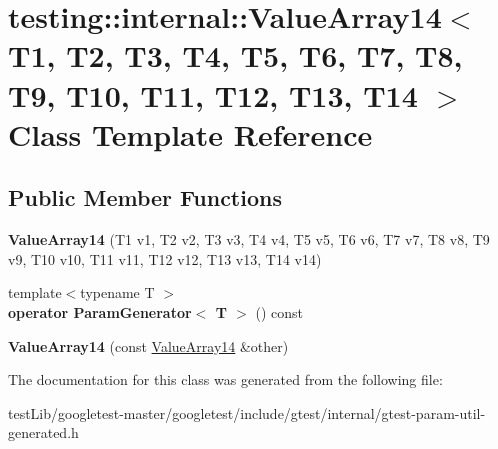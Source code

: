 \hypertarget{classtesting_1_1internal_1_1ValueArray14}{}\section{testing\+:\+:internal\+:\+:Value\+Array14$<$ T1, T2, T3, T4, T5, T6, T7, T8, T9, T10, T11, T12, T13, T14 $>$ Class Template Reference}
\label{classtesting_1_1internal_1_1ValueArray14}
\subsection*{Public Member Functions}
\begin{DoxyCompactItemize}
\item 
\mbox{\label{classtesting_1_1internal_1_1ValueArray14_a07a09d64aba1260d403adc661546ce48}} 
{\bfseries Value\+Array14} (T1 v1, T2 v2, T3 v3, T4 v4, T5 v5, T6 v6, T7 v7, T8 v8, T9 v9, T10 v10, T11 v11, T12 v12, T13 v13, T14 v14)
\item 
\mbox{\label{classtesting_1_1internal_1_1ValueArray14_aef77c9d7520c7313e2af66fd79185698}} 
{\footnotesize template$<$typename T $>$ }\\{\bfseries operator Param\+Generator$<$ T $>$} () const
\item 
\mbox{\label{classtesting_1_1internal_1_1ValueArray14_a41d4f0e6d12c86df58b24992a06300dc}} 
{\bfseries Value\+Array14} (const \hyperlink{classtesting_1_1internal_1_1ValueArray14}{Value\+Array14} \&other)
\end{DoxyCompactItemize}


The documentation for this class was generated from the following file\+:\begin{DoxyCompactItemize}
\item 
test\+Lib/googletest-\/master/googletest/include/gtest/internal/gtest-\/param-\/util-\/generated.\+h\end{DoxyCompactItemize}
